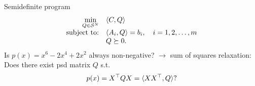 \begin{frame}{Semidefinite program}
      \begin{equation*}
        \label{eq:sdp_standard}
        \begin{array}{rl}
          \min\limits_{Q \in \SymK[N]} & \la C, Q \ra\\
          \text{subject to:} & \la A_i, Q \ra = b_i, \quad i=1,2,\ldots,m\\
          & Q \succeq 0.
        \end{array}
      \end{equation*}
      \pause
      Is $p(x) = x^6 - 2x^4 + 2x^2$ always non-negative? $\to$ sum of squares relaxation: Does there exist psd matrix $Q$ s.t. 
      \[p(x) = X^\top Q X = \langle X X^\top, Q \rangle ?\]
      

\end{frame}

